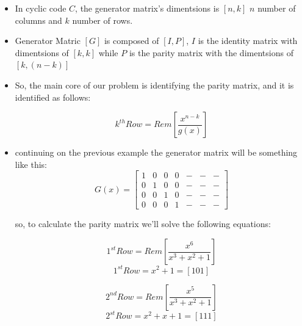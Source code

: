 \documentclass[a4paper,12pt]{report}
\begin{document}
{{    {\renewcommand\labelitemi{}
    \begin{itemize}
        \item In cyclic code $C$, the generator matrix's dimentsions is $[n,k]$
            $n$ number of columns and $k$ number of rows.
        \item Generator Matric $[G]$ is composed of $[I,P]$, $I$ is the identity matrix
            with dimentsions of $[k,k]$
            while $P$ is the parity matrix with the dimentsions of $[k, (n-k)]$
        \item So, the main core of our problem is identifying the parity matrix, 
        and it is identified as follows:

        \begin{equation*}
            k^{th} Row = Rem \left[ \frac{x^{n-k}}{g(x)} \right]
        \end{equation*}

        \item continuing on the previous example the generator matrix will be something like this:
        \begin{equation*}
            G(x) = \left[ 
                \begin{matrix}
                1 & 0 & 0 & 0 & - & - & -\\
                0 & 1 & 0 & 0 & - & - & - \\
                0 & 0 & 1 & 0 & - & - & - \\
                0 & 0 & 0 & 1 & - & - & -                
                \end{matrix}
               \right]
        \end{equation*}

        so, to calculate the parity matrix we'll solve the following equations:

        \begin{equation*}
            1^{st} Row = Rem \left[ \frac{x^{6}}{ x^3 + x^2 +1} \right]
        \end{equation*}
        \begin{equation*}
            1^{st} Row = x^2 +1 = [1 0 1]
        \end{equation*}

        \begin{equation*}
            2^{nd} Row = Rem \left[ \frac{x^{5}}{ x^3 + x^2 +1} \right]
        \end{equation*}
        \begin{equation*}
            2^{st} Row = x^2 +x +1 = [1 1 1]
        \end{equation*}


\end{itemize}}}}
\end{document}
